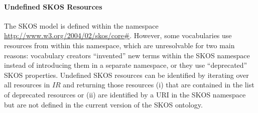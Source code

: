 \paragraph{Undefined SKOS Resources}

The SKOS model is defined within the namespace \url{http://www.w3.org/2004/02/skos/core#}. However, some vocabularies use resources from within this namespace, which are unresolvable for two main reasons: vocabulary creators ``invented'' new terms within the SKOS namespace instead of introducing them in a separate namespace, or they use ``deprecated'' SKOS properties.
Undefined SKOS resources can be identified by iterating over all resources in $IR$ and returning those resources (i) that are contained in the list of deprecated resources or (ii) are identified by a URI in the SKOS namespace but are not defined in the current version of the SKOS ontology.

